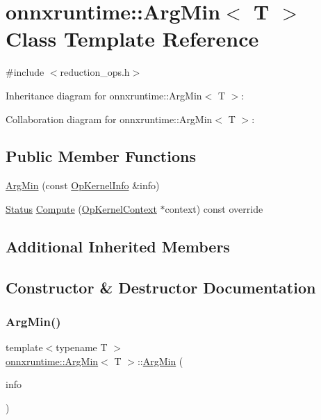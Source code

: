 \hypertarget{classonnxruntime_1_1ArgMin}{}\section{onnxruntime\+:\+:Arg\+Min$<$ T $>$ Class Template Reference}
\label{classonnxruntime_1_1ArgMin}


{\ttfamily \#include $<$reduction\+\_\+ops.\+h$>$}



Inheritance diagram for onnxruntime\+:\+:Arg\+Min$<$ T $>$\+:


Collaboration diagram for onnxruntime\+:\+:Arg\+Min$<$ T $>$\+:
\subsection*{Public Member Functions}
\begin{DoxyCompactItemize}
\item 
\mbox{\hyperlink{classonnxruntime_1_1ArgMin_a54b3bcbb229ae371fb692aec2c5e30e3}{Arg\+Min}} (const \mbox{\hyperlink{classonnxruntime_1_1OpKernelInfo}{Op\+Kernel\+Info}} \&info)
\item 
\mbox{\hyperlink{classonnxruntime_1_1common_1_1Status}{Status}} \mbox{\hyperlink{classonnxruntime_1_1ArgMin_a92caea3a1bb71eab40e4d8d8dade5d84}{Compute}} (\mbox{\hyperlink{classonnxruntime_1_1OpKernelContext}{Op\+Kernel\+Context}} $\ast$context) const override
\end{DoxyCompactItemize}
\subsection*{Additional Inherited Members}


\subsection{Constructor \& Destructor Documentation}
\mbox{\label{classonnxruntime_1_1ArgMin_a54b3bcbb229ae371fb692aec2c5e30e3}} 
\subsubsection{\texorpdfstring{Arg\+Min()}{ArgMin()}}
{\footnotesize\ttfamily template$<$typename T $>$ \\
\mbox{\hyperlink{classonnxruntime_1_1ArgMin}{onnxruntime\+::\+Arg\+Min}}$<$ T $>$\+::\mbox{\hyperlink{classonnxruntime_1_1ArgMin}{Arg\+Min}} (\begin{DoxyParamCaption}\item[{const \mbox{\hyperlink{classonnxruntime_1_1OpKernelInfo}{Op\+Kernel\+Info}} \&}]{info }\end{DoxyParamCaption})\hspace{0.3cm}{\ttfamily [inline]}}



